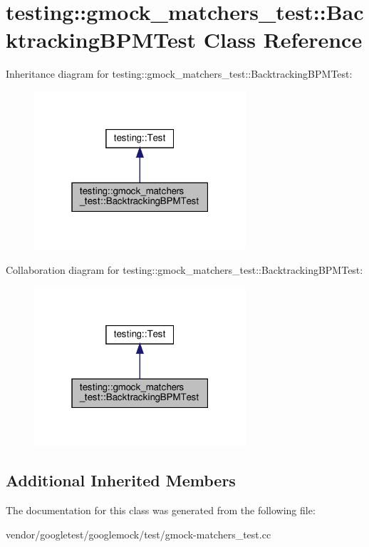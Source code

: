 \hypertarget{classtesting_1_1gmock__matchers__test_1_1_backtracking_b_p_m_test}{}\section{testing\+:\+:gmock\+\_\+matchers\+\_\+test\+:\+:Backtracking\+B\+P\+M\+Test Class Reference}
\label{classtesting_1_1gmock__matchers__test_1_1_backtracking_b_p_m_test}


Inheritance diagram for testing\+:\+:gmock\+\_\+matchers\+\_\+test\+:\+:Backtracking\+B\+P\+M\+Test\+:
\nopagebreak
\begin{figure}[H]
\begin{center}
\leavevmode
\includegraphics[width=223pt]{classtesting_1_1gmock__matchers__test_1_1_backtracking_b_p_m_test__inherit__graph}
\end{center}
\end{figure}


Collaboration diagram for testing\+:\+:gmock\+\_\+matchers\+\_\+test\+:\+:Backtracking\+B\+P\+M\+Test\+:
\nopagebreak
\begin{figure}[H]
\begin{center}
\leavevmode
\includegraphics[width=223pt]{classtesting_1_1gmock__matchers__test_1_1_backtracking_b_p_m_test__coll__graph}
\end{center}
\end{figure}
\subsection*{Additional Inherited Members}


The documentation for this class was generated from the following file\+:\begin{DoxyCompactItemize}
\item 
vendor/googletest/googlemock/test/gmock-\/matchers\+\_\+test.\+cc\end{DoxyCompactItemize}
